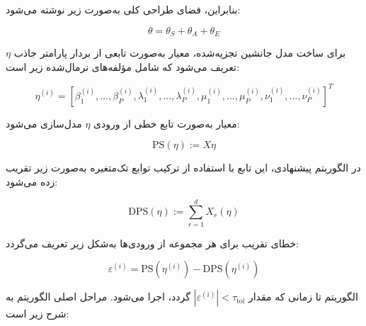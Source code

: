 بنابراین، فضای طراحی کلی به‌صورت زیر نوشته می‌شود:

\begin{equation}
\theta = \theta_S + \theta_A + \theta_E
\end{equation}

برای ساخت مدل جانشین تجزیه‌شده، معیار  به‌صورت تابعی از بردار پارامتر جاذب $\eta$ تعریف می‌شود که شامل مؤلفه‌های نرمال‌شده زیر است:

\begin{equation}
\eta^{(i)} = \left[
\beta_1^{(i)},\ldots,\beta_P^{(i)},
\lambda_1^{(i)},\ldots,\lambda_P^{(i)},
\mu_1^{(i)},\ldots,\mu_P^{(i)},
\nu_1^{(i)},\ldots,\nu_P^{(i)}
\right]^T
\end{equation}

معیار  به‌صورت تابع خطی از ورودی $\eta$ مدل‌سازی می‌شود:

\begin{equation}
\mathrm{PS}(\eta) := X\eta
\end{equation}

در الگوریتم پیشنهادی، این تابع با استفاده از ترکیب توابع تک‌متغیره به‌صورت زیر تقریب زده می‌شود:

\begin{equation}
\mathrm{DPS}(\eta) := \sum_{r=1}^d X_r(\eta)
\end{equation}

خطای تقریب برای هر مجموعه از ورودی‌ها به‌شکل زیر تعریف می‌گردد:

\begin{equation}
\varepsilon^{(i)} = \mathrm{PS}(\eta^{(i)}) - \mathrm{DPS}(\eta^{(i)})
\end{equation}

الگوریتم تا زمانی که مقدار $|\varepsilon^{(i)}| < \tau_{\mathrm{tol}}$ گردد، اجرا می‌شود. مراحل اصلی الگوریتم به شرح زیر است:

